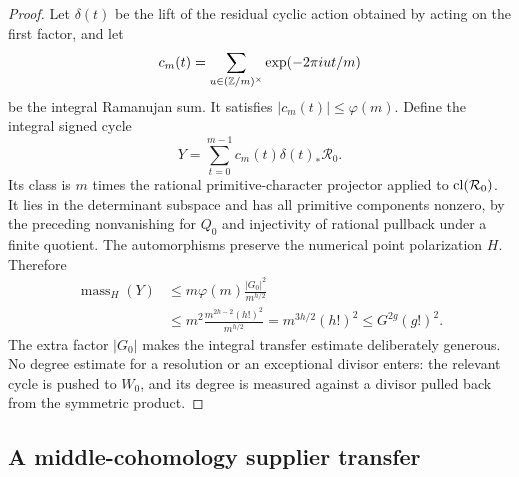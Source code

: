 \begin{proof}
Let $\delta(t)$ be the lift of the residual cyclic action obtained by acting on the first factor, and let
\[
 c_m(t)=\sum_{u\in(\mathbb Z/m)^\times}\exp(-2\pi iut/m)
\]
be the integral Ramanujan sum. It satisfies $|c_m(t)|\le\varphi(m)$. Define the integral signed cycle
\[
 Y=\sum_{t=0}^{m-1}c_m(t)\delta(t)_*\mathcal R_0.
\]
Its class is $m$ times the rational primitive-character projector applied to $\operatorname{cl}(\mathcal R_0)$. It lies in the determinant subspace and has all primitive components nonzero, by the preceding nonvanishing for $Q_0$ and injectivity of rational pullback under a finite quotient. The automorphisms preserve the numerical point polarization $H$. Therefore
\begin{align*}
 \operatorname{mass}_H(Y)
 &\le m\varphi(m)\frac{|G_0|^2}{m^{h/2}}\\
 &\le m^2\frac{m^{2h-2}(h!)^2}{m^{h/2}}
   =m^{3h/2}(h!)^2
   \le G^{2g}(g!)^2.
\end{align*}
The extra factor $|G_0|$ makes the integral transfer estimate deliberately generous. No degree estimate for a resolution or an exceptional divisor enters: the relevant cycle is pushed to $W_0$, and its degree is measured against a divisor pulled back from the symmetric product.
\end{proof}

\subsection{A middle-cohomology supplier transfer}

